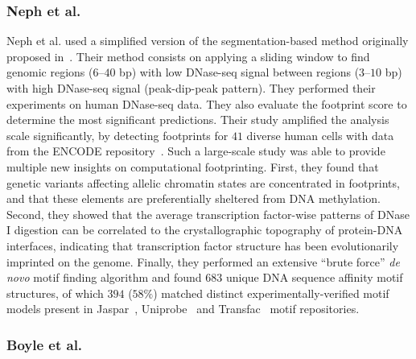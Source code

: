 \subsubsection{Neph et al.}
\label{sec:neph.2}

Neph et al.\cite{neph2012a} used a simplified version of the segmentation-based method originally proposed in~\cite{hesselberth2009}. Their method consists on applying a sliding window to find genomic regions ($6$--$40$ bp) with low DNase-seq signal between regions ($3$--$10$ bp) with high DNase-seq signal (peak-dip-peak pattern). They performed their experiments on human DNase-seq data. They also evaluate the footprint score to determine the most significant predictions. Their study amplified the analysis scale significantly, by detecting footprints for $41$ diverse human cells with data from the ENCODE repository~\cite{encode2012}. Such a large-scale study was able to provide multiple new insights on computational footprinting. First, they found that genetic variants affecting allelic chromatin states are concentrated in footprints, and that these elements are preferentially sheltered from DNA methylation. Second, they showed that the average transcription factor-wise patterns of DNase I digestion can be correlated to the crystallographic topography of protein-DNA interfaces, indicating that transcription factor structure has been evolutionarily imprinted on the genome. Finally, they performed an extensive ``brute force'' \emph{de novo} motif finding algorithm and found $683$ unique DNA sequence affinity motif structures, of which $394$ ($58\%$) matched distinct experimentally-verified motif models present in Jaspar~\cite{mathelier2014}, Uniprobe~\cite{robasky2011} and Transfac~\cite{matys2006} motif repositories.

\subsubsection{Boyle et al.}
\label{sec:boyle.2}

